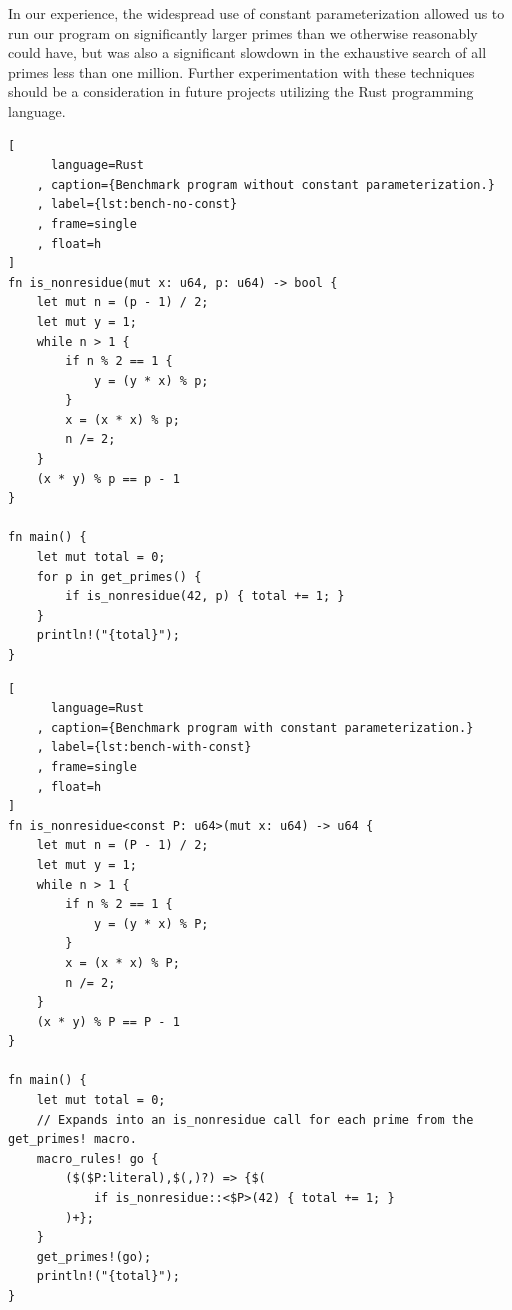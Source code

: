 \documentclass{article}
\theoremstyle{definition}
\theoremstyle{remark}
\begin{document}
In our experience, the widespread use of constant parameterization allowed us to run our program on significantly larger primes than we otherwise reasonably could have, but was also a significant slowdown in the exhaustive search of all primes less than one million.
Further experimentation with these techniques should be a consideration in future projects utilizing the Rust programming language.

\begin{lstlisting}[
      language=Rust
    , caption={Benchmark program without constant parameterization.}
    , label={lst:bench-no-const}
    , frame=single
    , float=h
]
fn is_nonresidue(mut x: u64, p: u64) -> bool {
    let mut n = (p - 1) / 2;
    let mut y = 1;
    while n > 1 {
        if n % 2 == 1 {
            y = (y * x) % p;
        }
        x = (x * x) % p;
        n /= 2;
    }
    (x * y) % p == p - 1
}

fn main() {
    let mut total = 0;
    for p in get_primes() {
        if is_nonresidue(42, p) { total += 1; }
    }
    println!("{total}");
}
\end{lstlisting}%

\begin{lstlisting}[
      language=Rust
    , caption={Benchmark program with constant parameterization.}
    , label={lst:bench-with-const}
    , frame=single
    , float=h
]
fn is_nonresidue<const P: u64>(mut x: u64) -> u64 {
    let mut n = (P - 1) / 2;
    let mut y = 1;
    while n > 1 {
        if n % 2 == 1 {
            y = (y * x) % P;
        }
        x = (x * x) % P;
        n /= 2;
    }
    (x * y) % P == P - 1
}

fn main() {
    let mut total = 0;
    // Expands into an is_nonresidue call for each prime from the get_primes! macro.
    macro_rules! go {
        ($($P:literal),$(,)?) => {$(
            if is_nonresidue::<$P>(42) { total += 1; }
        )+};
    }
    get_primes!(go);
    println!("{total}");
}
\end{lstlisting}%

\FloatBarrier
\printbibliography
\end{document}
